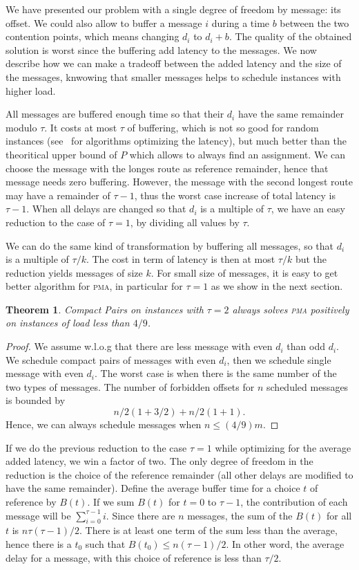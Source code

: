 \documentclass[10pt, conference, letterpaper]{IEEEtran}
\newtheorem{theorem}{Theorem}
\newcommand\pma{\textsc{pma}\xspace}
\begin{document}
We have presented our problem with a single degree of freedom by message: its
offset. We could also allow to buffer a message $i$ during a time $b$ between the two contention points, which means changing $d_i$ to $d_i + b$. The quality of the obtained solution is worst since the buffering add latency to the messages. We now describe how we can make a tradeoff between the added latency and the size of the messages, knwowing that smaller messages helps to schedule instances with higher load.


All messages are buffered enough time so that their $d_i$ have the same
remainder modulo $\tau$. It costs at most $\tau$ of buffering, which is not
so good for random instances (see~\cite{barth2018deterministic} for algorithms optimizing the latency), but much better than the theoritical upper bound of $P$ which allows to always find an assignment. We can choose the message with the longes route as reference remainder, hence that message needs zero buffering. However, the message with the second longest route may have a remainder of $\tau -1$, thus the worst case increase of total latency is $\tau -1$. When all delays are changed so that $d_i$ is a multiple of $\tau$, we have an
easy reduction to the case of $\tau = 1$, by dividing all values by $\tau$.

We can do the same kind of transformation by buffering all 
messages, so that $d_i$ is a multiple of $\tau / k$. The cost in term
of latency is then at most $\tau / k$ but the reduction yields messages of size $k$.
For small size of messages, it is easy to get better algorithm for \pma, in particular for $\tau =1$ as we show in the next section.
\begin{theorem}
Compact Pairs on instances with $\tau =2$ always solves \pma positively on instances of load less than $4/9$.
\end{theorem}
\begin{proof}
We assume w.l.o.g that there are less message with even $d_i$ than odd $d_i$.
We schedule compact pairs of messages with even $d_i$, then we schedule single message with 
even $d_i$. The worst case is when there is the same number of the two types of messages.
The number of forbidden offsets for $n$ scheduled messages is bounded by 
$$ n/2 (1 + 3/2) + n/2(1 + 1). $$
Hence, we can always schedule messages when $n \leq (4/9)m$.
\end{proof}


If we do the previous reduction to the case $\tau=1$ while optimizing for the average added latency, we win a factor of two. The only degree of freedom in the reduction is the choice of the reference remainder (all other delays are modified to have the same remainder).
Define the average buffer time for a choice $t$ of reference by $B(t)$. 
If we sum $B(t)$ for $t=0$ to $\tau-1$, the contribution of each message 
will be $\sum_{i=0}^{\tau-1} i$. Since there are $n$ messages, the sum of the $B(t)$ for all $t$ is $n \tau (\tau-1)/2$. There is at least one term of the sum less than the average,
hence there is a $t_0$ such that $B(t_0) \leq n (\tau-1)/2$. In other word, the average
delay for a message, with this choice of reference is less than $\tau/2$.
\end{document}
